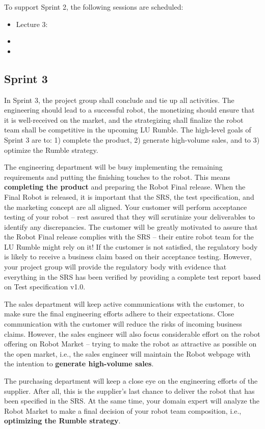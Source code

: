 \documentclass{scrreprt}
\begin{document}
To support Sprint 2, the following sessions are scheduled:
\begin{itemize}
\item Lecture 3:
\item 
\item
\end{itemize}

\subsection{Sprint 3}
In Sprint 3, the project group shall conclude and tie up all activities. The engineering should lead to a successful robot, the monetizing should ensure that it is well-received on the market, and the strategizing shall finalize the robot team shall be competitive in the upcoming LU Rumble. The high-level goals of Sprint 3 are to: 1) complete the product, 2) generate high-volume sales, and to 3) optimize the Rumble strategy.

The engineering department will be busy implementing the remaining requirements and putting the finishing touches to the robot. This means \textbf{completing the product} and preparing the Robot Final release. When the Final Robot is released, it is important that the SRS, the test specification, and the marketing concept are all aligned. Your customer will perform acceptance testing of your robot -- rest assured that they will scrutinize your deliverables to identify any discrepancies. The customer will be greatly motivated to assure that the Robot Final release complies with the SRS -- their entire robot team for the LU Rumble might rely on it! If the customer is not satisfied, the regulatory body is likely to receive a business claim based on their acceptance testing. However, your project group will provide the regulatory body with evidence that everything in the SRS has been verified by providing a complete test report based on Test specification v1.0.
 
The sales department will keep active communications with the customer, to make sure the final engineering efforts adhere to their expectations. Close communication with the customer will reduce the risks of incoming business claims. However, the sales engineer will also focus considerable effort on the robot offering on Robot Market -- trying to make the robot as attractive as possible on the open market, i.e., the sales engineer will maintain the Robot webpage with the intention to \textbf{generate high-volume sales}.

The purchasing department will keep a close eye on the engineering efforts of the supplier. After all, this is the supplier's last chance to deliver the robot that has been specified in the SRS. At the same time, your domain expert will analyze the Robot Market to make a final decision of your robot team composition, i.e., \textbf{optimizing the Rumble strategy}. 
\end{document}
